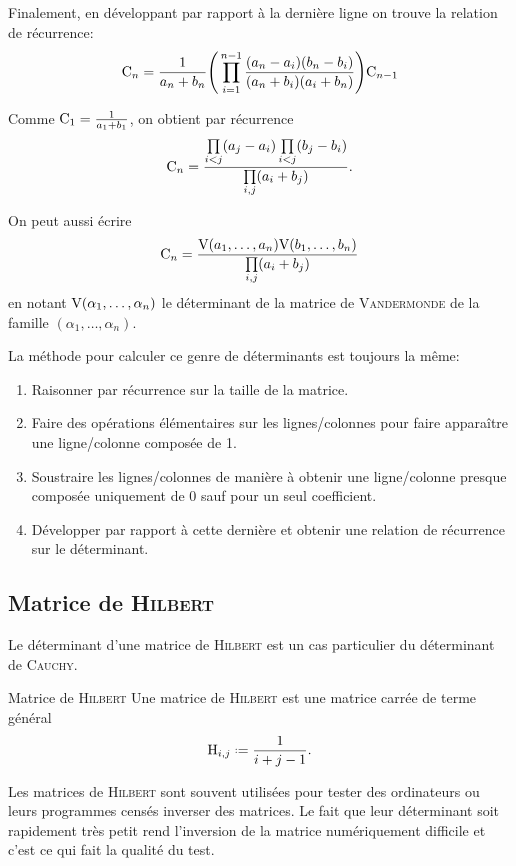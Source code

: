 \begin{preuve}
    Finalement, en développant par rapport à la dernière ligne on trouve la relation de récurrence:
    $$\mathrm{C}_n =  \frac{1}{a_n + b_n} \Bigg( \prod\limits_{i = 1}^{n-1}\frac{(a_n - a_i)(b_n - b_i)}{(a_n + b_i)(a_i + b_n)} \Bigg) \mathrm{C}_{n-1}$$
    
    Comme $\mathrm{C}_1 = \frac{1}{a_1+b_1}$, on obtient par récurrence
    $$\mathrm{C}_n = \frac{\prod\limits_{i<j}(a_j-a_i) \prod\limits_{i<j}(b_j-b_i)}{\prod\limits_{i,j}(a_i+b_j)}.$$
\end{preuve}

\begin{remarque}
    On peut aussi écrire
    $$\mathrm{C}_n = \frac{\mathrm{V}(a_1, \dots, a_n) \mathrm{V}(b_1, \dots, b_n)}{\prod\limits_{i,j}(a_i+b_j)}$$
    en notant $\mathrm{V}(\alpha_1, \dots, \alpha_n)$ le déterminant de la matrice de \textsc{Vandermonde} de la famille $(\alpha_1, \dots, \alpha_n)$.
\end{remarque}

\begin{methode}
    La méthode pour calculer ce genre de déterminants  est toujours la même: 
    \begin{enumerate}
        \item Raisonner par récurrence sur la taille de la matrice.
        \item Faire des opérations élémentaires sur les lignes/colonnes pour faire apparaître une ligne/colonne composée de 1. 
        \item Soustraire les lignes/colonnes de manière à obtenir une ligne/colonne presque composée uniquement de 0 sauf pour un seul coefficient. 
        \item Développer par rapport à cette dernière et obtenir une relation de récurrence sur le déterminant. 
    \end{enumerate}
\end{methode}

\subsection{Matrice de \textsc{Hilbert}}

Le déterminant d'une matrice de \textsc{Hilbert} est un cas particulier du déterminant de \textsc{Cauchy}.

\begin{defi}{Matrice de \textsc{Hilbert}}
    Une matrice de \textsc{Hilbert} est une matrice carrée de terme général
    $$\Hilb_{i,j} \defeq {\frac {1}{i+j-1}}.$$
\end{defi}

Les matrices de \textsc{Hilbert} sont souvent utilisées pour tester des ordinateurs ou leurs programmes censés inverser des matrices. Le fait que leur déterminant soit rapidement très petit rend l'inversion de la matrice numériquement difficile et c'est ce qui fait la qualité du test. 